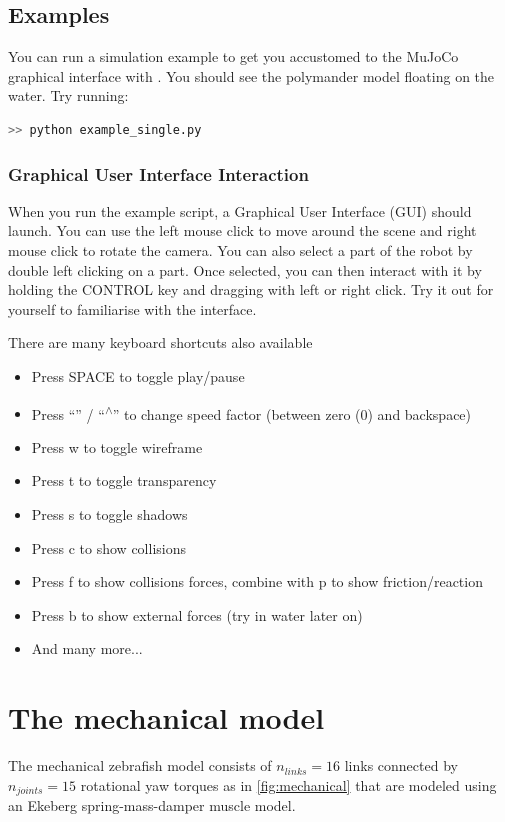 \documentclass{cmc}
\begin{document}
\subsection*{Examples}
You can run a simulation example to get you accustomed
to the MuJoCo graphical interface with . You
should see the polymander model floating on the water. Try running:
\label{sec:first-example}
\begin{lstlisting}[language=Bash]
  >> python example_single.py
\end{lstlisting}

\subsubsection*{Graphical User Interface Interaction}
When you run the example script, a Graphical User Interface (GUI) should launch.
You can use the left mouse click to move around the scene and right mouse click
to rotate the camera. You can also select a part of the robot by double left
clicking on a part. Once selected, you can then interact with it by holding the
CONTROL key and dragging with left or right click. Try it out for yourself to
familiarise with the interface.

There are many keyboard shortcuts also available

\begin{itemize}
\item Press SPACE to toggle play/pause
\item Press ``\textquotesingle'' / ``\textsuperscript{$\wedge$}'' to change
  speed factor (between zero (0) and backspace)
\item Press w to toggle wireframe
\item Press t to toggle transparency
\item Press s to toggle shadows
\item Press c to show collisions
\item Press f to show collisions forces, combine with p to show
  friction/reaction
\item Press b to show external forces (try in water later on)
\item And many more...
\end{itemize}


\section*{The mechanical model}\label{sec:mechanical}
The mechanical zebrafish model consists of $n_{links}=16$ links connected by $n_{joints}=15$
rotational yaw torques as in \ref{fig:mechanical} that are modeled using an
Ekeberg spring-mass-damper muscle model.
\end{document}
